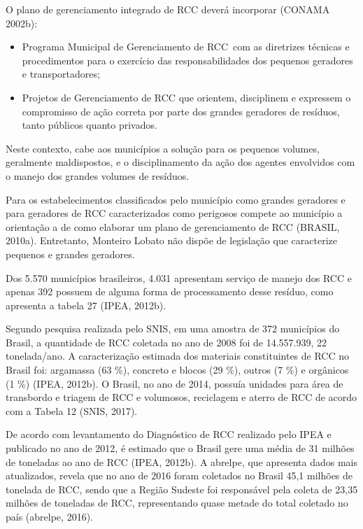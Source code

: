 	O plano de gerenciamento integrado de RCC deverá incorporar (CONAMA 2002b):
	
	\begin{itemize}
		\item Programa Municipal de Gerenciamento de RCC com as diretrizes técnicas e procedimentos para o exercício das responsabilidades dos pequenos geradores e transportadores;
		\item Projetos de Gerenciamento de RCC que orientem, disciplinem e expressem o compromisso de ação correta por parte dos grandes geradores de resíduos, tanto públicos quanto privados.
	\end{itemize}

	Neste contexto, cabe aos municípios a solução para os pequenos volumes, geralmente maldispostos, e o disciplinamento da ação dos agentes envolvidos com o manejo dos grandes volumes de resíduos.

	Para os estabelecimentos classificados pelo município como grandes geradores e para geradores de RCC caracterizados como perigosos compete ao município a orientação a de como elaborar um plano de gerenciamento de RCC (BRASIL, 2010a). Entretanto, Monteiro Lobato não dispõe de legislação que caracterize pequenos e grandes geradores.

	Dos 5.570 municípios brasileiros, 4.031 apresentam serviço de manejo dos RCC e apenas 392 possuem de alguma forma de processamento desse resíduo, como apresenta a tabela 27 (IPEA, 2012b). 
	
	
	
	Segundo pesquisa realizada pelo SNIS, em uma amostra de 372 municípios do Brasil, a quantidade de RCC coletada no ano de 2008 foi de 14.557.939, 22 tonelada/ano. A caracterização estimada dos materiais constituintes de RCC no Brasil foi: argamassa (63 \%), concreto e blocos (29 \%), outros (7 \%) e orgânicos (1 \%) (IPEA, 2012b). O Brasil, no ano de 2014, possuía unidades para área de transbordo e triagem de RCC e volumosos, reciclagem e aterro de RCC de acordo com a Tabela 12 (SNIS, 2017). 
	
	
	
	De acordo com levantamento do Diagnóstico de RCC realizado pelo IPEA e publicado no ano de 2012, é estimado que o Brasil gere uma média de 31 milhões de toneladas ao ano de RCC (IPEA, 2012b). A \gls{abrelpe}, que apresenta dados mais atualizados, revela que no ano de 2016 foram coletados no Brasil 45,1 milhões de tonelada de RCC, sendo que a Região Sudeste foi responsável pela coleta de 23,35 milhões de toneladas de RCC, representando quase metade do total coletado no país (\gls{abrelpe}, 2016).	
	
